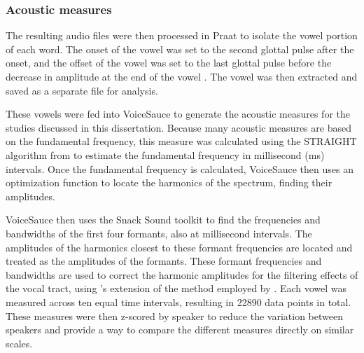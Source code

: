 \subsubsection{Acoustic measures} \label{sec:acoustics}

The resulting audio files were then processed in Praat to isolate the vowel portion of each word. The onset of the vowel was set to the second glottal pulse after the onset, and the offset of the vowel was set to the last glottal pulse before the decrease in amplitude at the end of the vowel \citep{garellekAcousticDiscriminabilityComplex2020}. The vowel was then extracted and saved as a separate file for analysis.

These vowels were fed into VoiceSauce \citep{shueVoiceSauceProgramVoice2011} to generate the acoustic measures for the studies discussed in this dissertation. Because many acoustic measures are based on the fundamental frequency, this measure was calculated using the STRAIGHT algorithm from \citep{kawaharaInstantaneousfrequencybasedPitchExtraction1998} to estimate the fundamental frequency in millisecond (ms) intervals. Once the fundamental frequency is calculated, VoiceSauce then uses an optimization function to locate the harmonics of the spectrum, finding their amplitudes.

VoiceSauce then uses the Snack Sound toolkit \citep{sjolanderSnackSoundToolkit2004} to find the frequencies and bandwidths of the first four formants, also at millisecond intervals. The amplitudes of the harmonics closest to these formant frequencies are located and treated as the amplitudes of the formants. These formant frequencies and bandwidths are used to correct the harmonic amplitudes for the filtering effects of the vocal tract, using \citeauthor{iseliAgeSexVowel2007}'s \citeyear{iseliAgeSexVowel2007} extension of the method employed by \citet{hansonGlottalCharacteristicsFemale1997}. Each vowel was measured across ten equal time intervals, resulting in 22890 data points in total. These measures were then z-scored by speaker to reduce the variation between speakers and provide a way to compare the different measures directly on similar scales.


